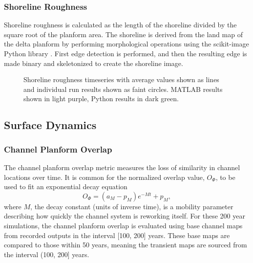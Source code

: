 \documentclass[a4paper]{article}
\begin{document}
\subsubsection{Shoreline Roughness}
Shoreline roughness is calculated as the length of the shoreline divided by the square root of the planform area.
The shoreline is derived from the land map of the delta planform by performing morphological operations using the scikit-image Python library \cite{scikit-image}.
First edge detection \cite{roberts1963machine} is performed, and then the resulting edge is made binary and skeletonized \cite{zhang1984fast} to create the shoreline image.

\begin{figure}[!ht]
	\caption{Shoreline roughness timeseries with average values shown as lines and individual run results shown as faint circles. MATLAB results shown in light purple, Python results in dark green.}
	\label{fig:shorelineroughness}
\end{figure}

\subsection{Surface Dynamics}

\subsubsection{Channel Planform Overlap}
The channel planform overlap metric \cite{Wickert2013} measures the loss of similarity in channel locations over time.
It is common for the normalized overlap value, $O_{\Phi}$, to be used to fit an exponential decay equation
\begin{equation}
O_\Phi = \left(a_M - p_M\right) e^{-Mt} + p_M,
\end{equation}
where $M$, the decay constant (units of inverse time), is a mobility parameter describing how quickly the channel system is reworking itself.
For these 200 year simulations, the channel planform overlap is evaluated using base channel maps from recorded outputs in the interval [100, 200] years.
These base maps are compared to those within 50 years, meaning the transient maps are sourced from the interval (100, 200] years.

\end{document}
